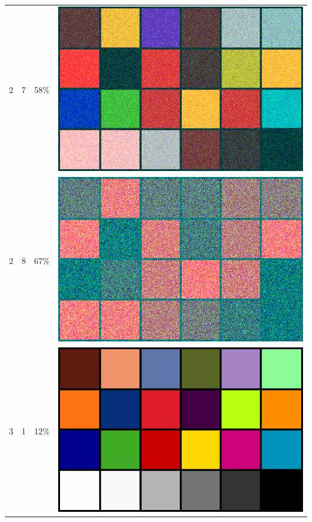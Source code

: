 \documentclass[times, utf8, seminar]{fer}
\begin{document}
\begin{center}
\begin{longtable}{|c|c|c|c|}
2 & 7 &58\% & \includegraphics[scale=0.3]{../benchmark_results/color_chart/2_components-7_bits.png} \\
2 & 8 &67\% & \includegraphics[scale=0.3]{../benchmark_results/color_chart/2_components-8_bits.png} \\
3 & 1 &12\% & \includegraphics[scale=0.3]{../benchmark_results/color_chart/3_components-1_bits.png} \\

\end{longtable}
\end{center}
\end{document}
